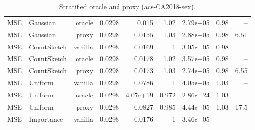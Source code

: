 \begin{table}[t]
\begin{tabular}{llrrrrrrr}
MSE & Gaussian & oracle & 0.0298 & 0.015 & 1.02 & 2.79e+05 & 0.98 & -- \\
MSE & Gaussian & proxy & 0.0298 & 0.0155 & 1.03 & 2.88e+05 & 0.98 & 6.51 \\
MSE & CountSketch & vanilla & 0.0298 & 0.0169 & 1 & 3.05e+05 & 0.98 & -- \\
MSE & CountSketch & oracle & 0.0298 & 0.0178 & 1.02 & 3.57e+05 & 0.98 & -- \\
MSE & CountSketch & proxy & 0.0298 & 0.0173 & 1.03 & 2.74e+05 & 0.98 & 6.55 \\
MSE & Uniform & vanilla & 0.0298 & 0.0786 & 1 & 4.05e+05 & 1.03 & -- \\
MSE & Uniform & oracle & 0.0298 & 4.07e+19 & 0.972 & 2.86e+24 & 1.03 & -- \\
MSE & Uniform & proxy & 0.0298 & 0.0827 & 0.985 & 4.44e+05 & 1.03 & 17.5 \\
MSE & Importance & vanilla & 0.0298 & 0.0176 & 1 & 3.46e+05 & -- & -- \\
\bottomrule
\end{tabular}
\caption{Stratified oracle and proxy (acs-CA2018-sex).}
\label{tab:strat_acs-CA2018-sex}
\end{table}